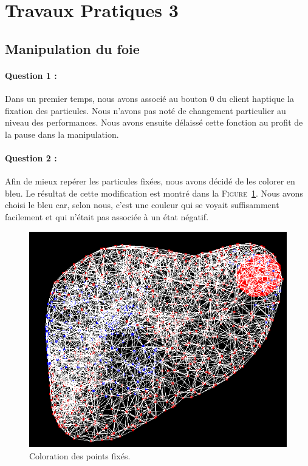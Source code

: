 \documentclass[a4paper,12pt]{article}
\begin{document}
\section{Travaux Pratiques 3}

\subsection{Manipulation du foie}
\paragraph{Question 1 :} Dans un premier temps, nous avons associé au bouton 0 du client haptique la fixation des particules. Nous n'avons pas noté de changement particulier au niveau des performances. Nous avons ensuite délaissé cette fonction au profit de la pause dans la manipulation.

\paragraph{Question 2 :} Afin de mieux repérer les particules fixées, nous avons décidé de les colorer en bleu. Le résultat de cette modification est montré dans la \textsc{Figure}~\ref{fig:fixed}. Nous avons choisi le bleu car, selon nous, c'est une couleur qui se voyait suffisamment facilement et qui n'était pas associée à un état négatif.
\begin{figure}[ht!]
  \centering
  \includegraphics[width=\textwidth]{images/couleur_points_fixes.png}
  \caption{Coloration des points fixés.}
  \label{fig:fixed}
\end{figure}
\end{document}
